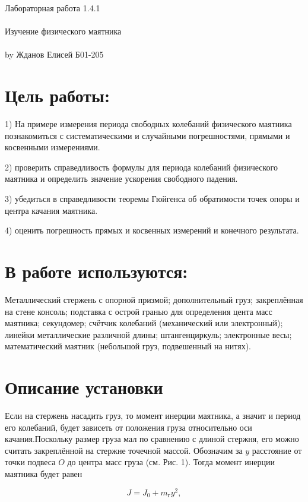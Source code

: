 \documentclass{astroedu-lab}
\begin{document}
\pagestyle{plain}

\begin{problem}{\huge Лабораторная работа 1.4.1\\\\Изучение физического маятника\\\\by Жданов Елисей Б01-205}

\section{Цель работы:}

1) На примере измерения периода свободных колебаний физического маятника познакомиться с систематическими и случайными погрешностями, прямыми и косвенными измерениями.

2) проверить справедливость формулы для периода колебаний физического маятника и определить значение ускорения свободного падения.

3) убедиться в справедливости теоремы Гюйгенса об обратимости точек опоры и центра качания маятника.

4) оценить погрешность прямых и косвенных измерений и конечного результата.

\section{В работе используются:}

Металлический стержень с опорной призмой; дополнительный груз; закреплённая на стене консоль; подставка с острой гранью для определения цента масс маятника; секундомер; счётчик колебаний (механический или электронный); линейки металлические различной длины; штангенциркуль; электронные весы; математический маятник (небольшой груз, подвешенный на нитях).

\section{Описание установки}

Если на стержень насадить груз, то момент инерции маятника, а значит и период его колебаний, будет зависеть от положения груза относительно оси качания.Поскольку размер груза мал по сравнению с длиной стержня, его можно считать закреплённой на стержне точечной массой. Обозначим за \(y\) расстояние от точки подвеса \(O\) до центра масс груза (см. Рис. 1). Тогда момент инерции маятника будет равен

\[
J=J_{0}+m_{\text{г}} y^{2},
\]


\end{problem}
\end{document}
